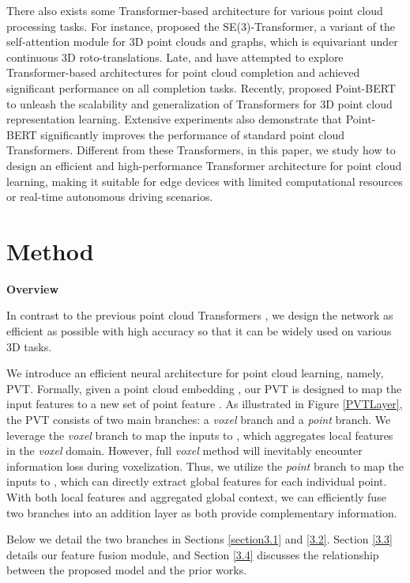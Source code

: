 \documentclass[10pt,twocolumn,letterpaper]{article}
\begin{document}
There also exists some Transformer-based architecture for various point cloud processing tasks. For instance, \cite{se3} proposed the SE(3)-Transformer, a variant of the self-attention module for 3D point clouds and graphs, which is equivariant under continuous 3D roto-translations. Late, \cite{pointtr} and \cite{snow} have attempted to explore Transformer-based architectures for point cloud completion and achieved significant performance on all completion tasks. Recently, \cite{point-bert} proposed Point-BERT to unleash the scalability and generalization of Transformers for 3D point cloud representation learning. Extensive experiments also demonstrate that Point-BERT significantly improves the performance of standard point cloud Transformers. Different from these Transformers, in this paper, we study how to design an efficient and high-performance Transformer architecture for point cloud learning, making it suitable for edge devices with limited computational resources or real-time autonomous driving scenarios.
\section{Method}

\noindent \textbf{Overview}

In contrast to the previous point cloud Transformers \cite{guo2020pct,Nico,zhao2020point}, we design the network as efficient as possible with high accuracy so that it can be widely used on various 3D tasks.

We introduce an efficient neural architecture for point cloud learning, namely, PVT. Formally, given a point cloud embedding , our PVT is designed to map the input features  to a new set of point feature . As illustrated in Figure \ref{PVTLayer}, the PVT consists of two main branches: a \emph{voxel} branch and a \emph{point} branch. We leverage the \emph{voxel} branch to map the inputs  to , which aggregates local features in the \emph{voxel} domain. However, full \emph{voxel} method will inevitably encounter information loss during voxelization. Thus, we utilize the \emph{point} branch to map the inputs  to , which can directly extract global features for each individual point. With both local features and aggregated global context, we can efficiently fuse two branches into an addition layer as both provide complementary information.

Below we detail the two branches in Sections \ref{section3.1} and \ref{3.2}. Section \ref{3.3} details our feature fusion module, and Section \ref{3.4} discusses the relationship between the proposed model and the prior works.
\end{document}
